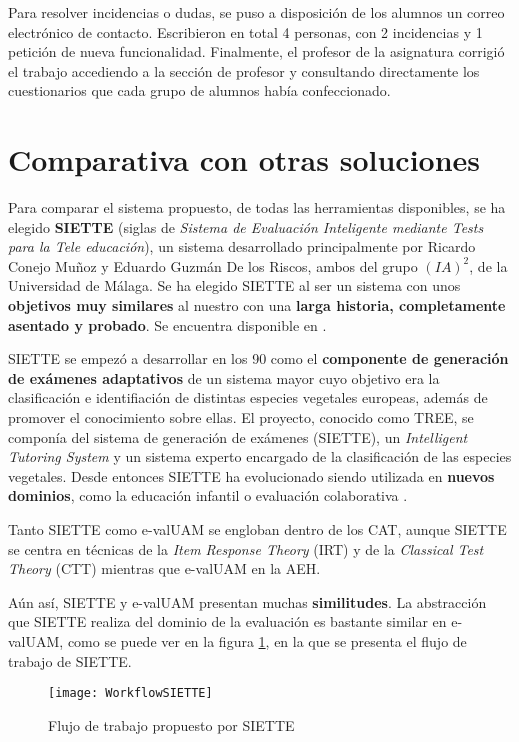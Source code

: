 Para resolver incidencias o dudas, se puso a disposición de los alumnos un correo electrónico de contacto. Escribieron en total 4 personas, con 2 incidencias y 1 petición de nueva funcionalidad. Finalmente, el profesor de la asignatura corrigió el trabajo accediendo a la sección de profesor y consultando directamente los cuestionarios que cada grupo de alumnos había confeccionado.

\section{Comparativa con otras soluciones}

Para comparar el sistema propuesto, de todas las herramientas disponibles, se ha elegido \textbf{SIETTE} (siglas de \textit{Sistema de Evaluación Inteligente mediante Tests para la Tele educación}), un sistema desarrollado principalmente por Ricardo Conejo Muñoz y Eduardo Guzmán De los Riscos, ambos del grupo $(IA)^2$, de la Universidad de Málaga. Se ha elegido SIETTE al ser un sistema con unos \textbf{objetivos muy similares} al nuestro con una \textbf{larga historia, completamente asentado y probado}. Se encuentra disponible en \cite{SIETTE}.

SIETTE se empezó a desarrollar en los 90 como el \textbf{componente de generación de exámenes adaptativos} de un sistema mayor cuyo objetivo era la clasificación e identifiación de distintas especies vegetales europeas, además de promover el conocimiento sobre ellas. El proyecto, conocido como TREE, se componía del sistema de generación de exámenes (SIETTE), un \textit{Intelligent Tutoring System} y un sistema experto encargado de la clasificación de las especies vegetales\cite{Rios98}. Desde entonces SIETTE ha evolucionado siendo utilizada en \textbf{nuevos dominios}, como la educación infantil\cite{Trella08} o evaluación colaborativa \cite{Conejo09}.

Tanto SIETTE como e-valUAM se engloban dentro de los \acrshort{CAT}, aunque SIETTE se centra en técnicas de la \textit{Item Response Theory} (\acrshort{IRT}) y de la \textit{Classical Test Theory} (\acrshort{CTT}) mientras que e-valUAM en la \acrshort{AEH}.

Aún así, SIETTE y e-valUAM presentan muchas \textbf{similitudes}. La abstracción que SIETTE realiza del dominio de la evaluación es bastante similar en e-valUAM, como se puede ver en la figura \ref{fig:SIETTE workflow}, en la que se presenta el flujo de trabajo de SIETTE. 

\begin{figure}[htp!]
	\centering
	\texttt{[image: WorkflowSIETTE]}
	\caption{Flujo de trabajo propuesto por SIETTE\cite{SIETTEWiki}}
	\label{fig:SIETTE workflow}
\end{figure}

